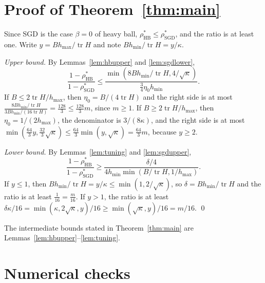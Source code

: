 \documentclass[11pt]{amsart}
\theoremstyle{definition}
\theoremstyle{remark}
\numberwithin{equation}{section}
\newcommand{\tr}{\operatorname{tr}}
\newcommand{\hmax}{h_{\max}}
\newcommand{\hmin}{h_{\min}}
\begin{document}
\section{Proof of Theorem~\ref{thm:main}}\label{sec:proof}

Since SGD is the case $\beta=0$ of heavy ball, $\rho^*_{\mathrm{HB}}\le\rho^*_{\mathrm{SGD}}$, and the ratio is at least one. Write $y=B\hmax/\tr H$ and note $B\hmin/\tr H=y/\kappa$.

\emph{Upper bound.} By Lemmas~\ref{lem:hbupper} and \ref{lem:sgdlower},
\[
\frac{1-\rho^*_{\mathrm{HB}}}{1-\rho^*_{\mathrm{SGD}}}\le\frac{\min(8B\hmin/\tr H,4/\sqrt\kappa)}{\frac34\eta_0\hmin}.
\]
If $B\le2\tr H/\hmax$, then $\eta_0=B/(4\tr H)$ and the right side is at most $\frac{8B\hmin/\tr H}{3B\hmin/(16\tr H)}=\frac{128}3\le\frac{128}3m$, since $m\ge1$. If $B\ge2\tr H/\hmax$, then $\eta_0=1/(2\hmax)$, the denominator is $3/(8\kappa)$, and the right side is at most $\min(\frac{64}3y,\frac{32}3\sqrt\kappa)\le\frac{64}3\min(y,\sqrt\kappa)=\frac{64}{3}m$, because $y\ge2$.

\emph{Lower bound.} By Lemmas~\ref{lem:tuning} and \ref{lem:sgdupper},
\[
\frac{1-\rho^*_{\mathrm{HB}}}{1-\rho^*_{\mathrm{SGD}}}\ge\frac{\delta/4}{4\hmin\min(B/\tr H,1/\hmax)} .
\]
If $y\le1$, then $B\hmin/\tr H=y/\kappa\le\min(1,2/\sqrt\kappa)$, so $\delta=B\hmin/\tr H$ and the ratio is at least $\frac1{16}=\frac{m}{16}$. If $y>1$, the ratio is at least $\delta\kappa/16=\min(\kappa,2\sqrt\kappa,y)/16\ge\min(\sqrt\kappa,y)/16=m/16$. \qed

The intermediate bounds stated in Theorem~\ref{thm:main} are Lemmas~\ref{lem:hbupper}--\ref{lem:tuning}.

\section{Numerical checks}\label{sec:numerics}
\end{document}
